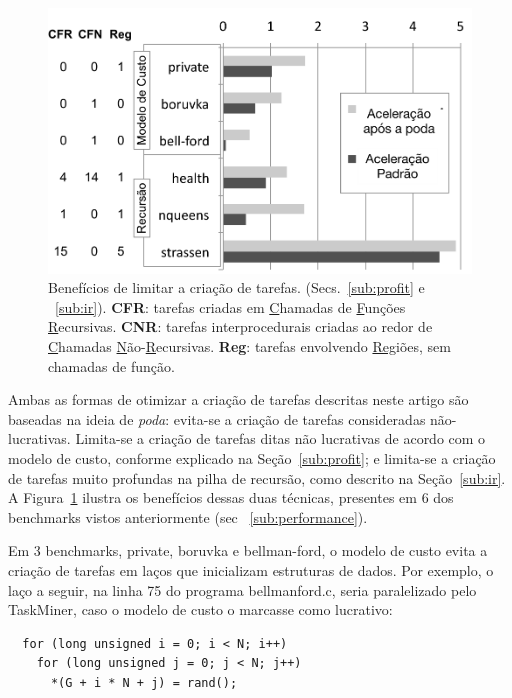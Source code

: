 \documentclass[sigplan,10pt]{acmart}
\newcommand\Taskminer{\mbox{\textsf{TaskMiner}}}
\begin{document}
\begin{figure}[b!]
\begin{center}
\includegraphics[width=1\columnwidth]{images/Optimizations}
\caption{Benefícios de limitar a criação de tarefas. (Secs.~\ref{sub:profit} e ~\ref{sub:ir}).
\textbf{CFR}: tarefas criadas em \underline{C}hamadas de \underline{F}unções \underline{R}ecursivas.
\textbf{CNR}: tarefas interprocedurais criadas ao redor de \underline{C}hamadas  \underline{N}ão-\underline{R}ecursivas.
\textbf{Reg}: tarefas envolvendo \underline{Reg}iões, sem chamadas de função.}
\label{fig:Optimizations}
\end{center}
\end{figure}

Ambas as formas de 
otimizar a criação de tarefas descritas neste artigo são baseadas na ideia de 
{\em poda}: evita-se a criação de tarefas consideradas não-lucrativas. 
Limita-se a criação de tarefas ditas não lucrativas de acordo com o modelo de custo, 
conforme explicado na 
Seção~\ref{sub:profit}; e limita-se a criação de tarefas muito profundas na pilha de recursão, 
como descrito na Seção~\ref{sub:ir}. A Figura~\ref{fig:Optimizations} ilustra os benefícios dessas duas técnicas,
presentes em 6 dos benchmarks vistos anteriormente (sec ~\ref{sub:performance}).

Em 3 benchmarks, \textsf{private}, \textsf{boruvka} e
\textsf{bellman-ford}, o modelo de custo evita a criação de tarefas em laços que inicializam estruturas de dados.
Por exemplo, o laço a seguir, na linha 75 do programa \textsf{bellmanford.c}, seria paralelizado pelo
\Taskminer{}, caso o modelo de custo o marcasse como lucrativo:

\begin{verbatim}
  for (long unsigned i = 0; i < N; i++)
    for (long unsigned j = 0; j < N; j++)
      *(G + i * N + j) = rand();
\end{verbatim}
\end{document}
